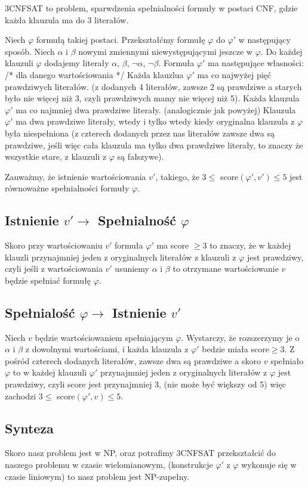 \documentclass{article}
\begin{document}
3CNFSAT to problem, sparwdzenia spełnialności formuły w postaci CNF, gdzie każda klauzula ma do 3 literałów.

Niech $\varphi$ formułą takiej postaci. \newline
Przekształćmy formułę $\varphi$ do $\varphi'$ w następujący sposób.
Niech $\alpha$ i $\beta$ nowymi zmiennymi niewystępującymi jeszcze w $\varphi$. Do każdej klauzuli
$\varphi$ dodajemy literały $\alpha$, $\beta$, $\neg \alpha$, $\neg \beta$. \newline \newline
Formuła $\varphi'$ ma następujące własności: 
/* dla danego wartościowania */ \newline \newline
Każda klauzlua $\varphi'$ ma co najwyżej pięć prawdziwych literałów. (z dodanych 4 literałów, zawsze 2 są prawdziwe a starych było nie więcej niż 3, czyli prawdziwych mamy nie więcej niż 5). \newline \newline
Każda klauzula $\varphi'$ ma co najmniej dwa prawdziwe literały. (analogicznie jak powyżej)\newline 
Klauzula $\varphi'$ ma dwa prawdziwe literały, wtedy i tylko wtedy kiedy oryginalna klauzula z $\varphi$ była niespełniona (z czterech dodanych przez nas literałów zawsze dwa są prawdziwe, jeśli więc cała klauzula ma tylko dwa prawdziwe literały, to znaczy że wszystkie stare, z klauzuli z $\varphi$ są fałszywe).

Zauważmy, że istnienie wartościowania $v'$, takiego, że $3 \le$ score$(\varphi', v') \le 5$
jest równoważne spełnialności formuły $\varphi$. \newline

\subsection*{Istnienie $v' \to$ Spełnialność $\varphi$}
Skoro przy wartościowaniu $v'$ formuła $\varphi'$ ma score $\ge3$ to znaczy, że w każdej klauzli przynajmniej jeden z oryginalnych literałów z klauzuli z $\varphi$ jest prawdziwy, czyli jeśli z wartościowania $v'$ usuniemy $\alpha$ i $\beta$ to otrzymane wartościowanie $v$ będzie spełniać formułę $\varphi$.

\subsection*{Spełnialość $\varphi \to$ Istnienie $v'$}
Niech $v$ będzie wartościowaniem spełniającym $\varphi$. Wystarczy, że rozszerzymy je o $\alpha$ i $\beta$ z dowolnymi wartościami, i każda klauzula z $\varphi'$ bedzie miała score$\ge3$.
Z pośród czterech dodanych literałów, zawsze dwa są prawdziwe a skoro $v$ spełniało $\varphi$ to w każdej klauzuli $\varphi'$ przynajmniej jeden z oryginalnych literałów z $\varphi$ jest prawdziwy, czyli score jest przynajmniej 3, (nie może być większy od 5) więc zachodzi $3\le$ score$(\varphi', v)\le5$.

\subsection*{Synteza}
Skoro nasz problem jest w NP, oraz potrafimy 3CNFSAT przekształcić do naszego problemu w czasie wielomianowym, (konstrukcje $\varphi'$ z $\varphi$ wykonuje się w czasie liniowym) to nasz problem jest NP-zupełny.
\end{document}
